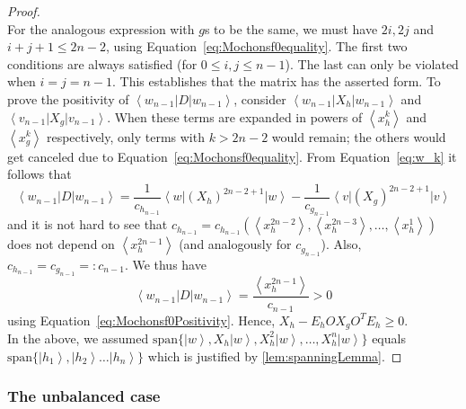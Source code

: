 \documentclass{theoretics}
\begin{document}
\begin{proof}
\begin{equation}
  \end{equation}
  For the analogous expression with $g$s to be the same, we must have
  $2i,2j$ and $i+j+1\leq2n-2$, using Equation~\eqref{eq:Mochonsf0equality}. The first two conditions
  are always satisfied (for $0\le i,j\le n-1$). The last can only be
  violated when $i=j=n-1$. This establishes that the matrix has the
  asserted form.	To prove the positivity of $\left\langle w_{n-1}\right|D\left|w_{n-1}\right\rangle $,
  consider $\left\langle w_{n-1}\right|X_{h}\left|w_{n-1}\right\rangle $
  and $\left\langle v_{n-1}\right|X_{g}\left|v_{n-1}\right\rangle $.
  When these terms are expanded in powers of $\left\langle x_{h}^{k}\right\rangle $
  and $\left\langle x_{g}^{k}\right\rangle $ respectively, only terms
  with $k>2n-2$ would remain; the others would get canceled due to
  Equation~\eqref{eq:Mochonsf0equality}. From Equation~\eqref{eq:w_k} it follows that
  \begin{displaymath}
    \left\langle w_{n-1}\right|D\left|w_{n-1}\right\rangle =\frac{1}{c_{h_{n-1}}}\left\langle w\right|(X_{h})^{2n-2+1}\left|w\right\rangle -\frac{1}{c_{g_{n-1}}}\left\langle v\right|(X_{g})^{2n-2+1}\left|v\right\rangle
  \end{displaymath}
  and it is not hard to see that $c_{h_{n-1}}=c_{h_{n-1}}(\left\langle x_{h}^{2n-2}\right\rangle ,\left\langle x_{h}^{2n-3}\right\rangle ,\dots,\left\langle x_{h}^{1}\right\rangle )$
  does not depend on $\left\langle x_{h}^{2n-1}\right\rangle $ (and analogously for $c_{g_{n-1}}$). Also, $c_{h_{n-1}}=c_{g_{n-1}}=:c_{n-1}$.
  We thus have
  \begin{displaymath}
    \left\langle w_{n-1}\right|D\left|w_{n-1}\right\rangle =\frac{\left\langle x_{h}^{2n-1}\right\rangle }{c_{n-1}}>0
  \end{displaymath}
  using Equation~\eqref{eq:Mochonsf0Positivity}. Hence, $X_{h}-E_{h}OX_{g}O^{T}E_{h}\ge0$.\\
  In the above, we assumed $\text{span}\{\left|w\right\rangle ,X_{h}\left|w\right\rangle ,X_{h}^{2}\left|w\right\rangle ,\dots,X_{h}^{n}\left|w\right\rangle \}$
  equals $\text{span}\{\left|h_{1}\right\rangle ,\left|h_{2}\right\rangle \dots\left|h_{n}\right\rangle \}$
  which is justified by \cref{lem:spanningLemma}.
\end{proof}




\subsubsection{The unbalanced case}
\label{subsubsec:unbalancedf0algebraic}
\end{document}
